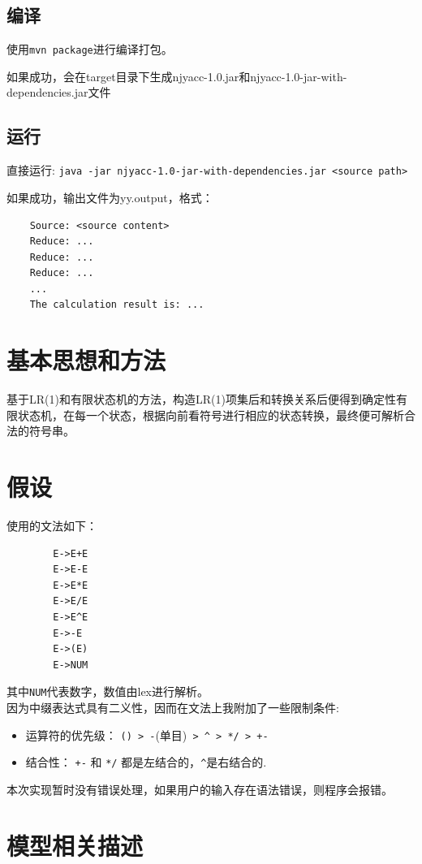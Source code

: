 \documentclass[a4paper]{ctexart} %
\begin{document}
	\subsection{编译}
	使用\verb|mvn package|进行编译打包。

	如果成功，会在target目录下生成njyacc-1.0.jar和njyacc-1.0-jar-with-dependencies.jar文件

	\subsection{运行}

	直接运行: \verb|java -jar njyacc-1.0-jar-with-dependencies.jar <source path>|

	如果成功，输出文件为yy.output，格式：
	\begin{verbatim}
    Source: <source content>
    Reduce: ...
    Reduce: ...
    Reduce: ...
    ...
    The calculation result is: ...
	\end{verbatim}


	\section{基本思想和方法}
	基于LR(1)和有限状态机的方法，构造LR(1)项集后和转换关系后便得到确定性有限状态机，在每一个状态，根据向前看符号进行相应的状态转换，最终便可解析合法的符号串。

	\section{假设}
	使用的文法如下：
	\begin{verbatim}
        E->E+E
        E->E-E
        E->E*E
        E->E/E
        E->E^E
        E->-E
        E->(E)
        E->NUM
	\end{verbatim}
	其中\verb|NUM|代表数字，数值由lex进行解析。\\
	因为中缀表达式具有二义性，因而在文法上我附加了一些限制条件:

	\begin{itemize}
		\item 运算符的优先级： \verb|() > -|(单目)\verb| > ^ > */ > +-|
		\item  结合性： \verb|+-| 和 \verb|*/| 都是左结合的，\verb|^|是右结合的.
	\end{itemize}


	本次实现暂时没有错误处理，如果用户的输入存在语法错误，则程序会报错。

	\section{模型相关描述}
\end{document}
